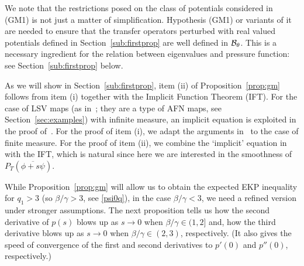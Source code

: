 \documentclass[12pt]{article}
\numberwithin{equation}{section}
\begin{document}
\begin{rmk}\label{rmk:clspot}
 We note that the restrictions posed on the class of potentials considered in (GM1) is not just a matter of simplification. 
Hypothesis (GM1) or variants of it are needed to ensure that the transfer operators perturbed with real valued potentials 
 defined in Section~\ref{sub:firstprop} are well defined in $\mathcal{B}_\theta$.
 This is a necessary ingredient for the relation between eigenvalues and pressure function: 
 see Section~\ref{sub:firstprop} below.
\end{rmk}

As we will show in Section~\ref{sub:firstprop}, 
 item (ii) of Proposition~\ref{prop:gm} follows from item (i) together with
the Implicit Function Theorem (IFT).
For the case of LSV maps (as in~\cite{LiveraniSaussolVaienti99}; they are a type of AFN maps, see Section~\ref{sec:examples}) with infinite measure, an implicit equation is exploited in the proof of~\cite[Proof of Theorem 4.1]{BruTerTod19}. For the proof of item (i), we adapt the arguments in~\cite{BruTerTod19} to the case of finite measure. For the proof of item (ii), we combine the `implicit' equation
in~\cite[Proof of Theorem 4.1]{BruTerTod19} with the IFT,
which is natural since here we are interested in the smoothness of $P_{T}(\overline{\phi+s\psi})$.

While Proposition~\ref{prop:gm} will allow us to obtain the expected EKP inequality for $q_1>3$
(so $\beta/\gamma > 3$, see \eqref{psi0q}), in the case $\beta/\gamma<3$, we need a refined version
under stronger assumptions. The next proposition tells us how the second derivative of $p(s)$ blows up as $s\to 0$ when  $\beta/\gamma\in (1,2]$
and, how the third derivative blows up as $s\to 0$ when  $\beta/\gamma\in (2,3)$, respectively. (It also gives the speed of convergence of the first and second
derivatives to $p'(0)$ and $p''(0)$, respectively.)
\end{document}
